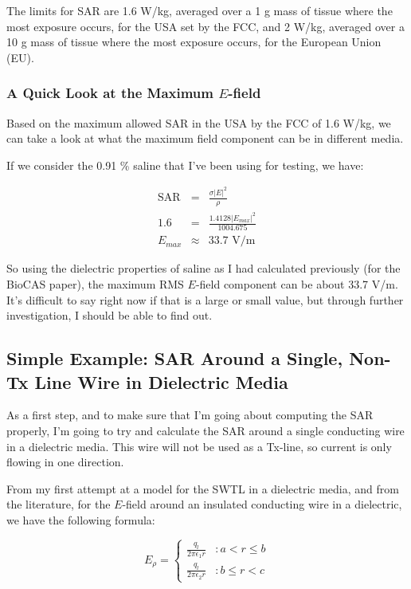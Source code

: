 \documentclass[12pt,onecolumn,titlepage]{article}
\begin{document}
The limits for SAR are 1.6 W/kg, averaged over a 1 g mass of tissue where the most exposure occurs, for the USA set by the FCC, and 2 W/kg, averaged over a 10 g mass of tissue where the most exposure occurs, for the European Union (EU). 

\subsubsection{A Quick Look at the Maximum $E$-field}
\indent \indent Based on the maximum allowed SAR in the USA by the FCC of 1.6 W/kg, we can take a look at what the maximum field component can be in different media.

If we consider the 0.91 \% saline that I've been using for testing, we have:

\begin{eqnarray}
\text{SAR} &=& \frac{\sigma \left| E \right|^2}{\rho} \\
1.6 &=& \frac{1.4128 \left| E_{max} \right|^2}{1004.675} \\ 
E_{max} &\approx&  33.7 \, \, \text{V/m}
\end{eqnarray}

So using the dielectric properties of saline as I had calculated previously (for the BioCAS paper), the maximum RMS $E$-field component can be about 33.7 V/m. It's difficult to say right now if that is a large or small value, but through further investigation, I should be able to find out.


\subsection{Simple Example: SAR Around a Single, Non-Tx Line Wire in Dielectric Media}
\indent \indent As a first step, and to make sure that I'm going about computing the SAR properly, I'm going to try and calculate the SAR around a single conducting wire in a dielectric media. This wire will not be used as a Tx-line, so current is only flowing in one direction.

From my first attempt at a model for the SWTL in a dielectric media, and from the literature, for the $E$-field around an insulated conducting wire in a dielectric, we have the following formula:

\begin{equation}
\label{equ:E-field}
   E_{\rho} = \left\{
     \begin{array}{lr}
       \frac{q_l}{2 \pi \epsilon_1 r} & : a < r \leq b\\
       \frac{q_l}{2 \pi \epsilon_2 r} & : b \leq r < c
     \end{array}
   \right.
\end{equation}
\end{document}
